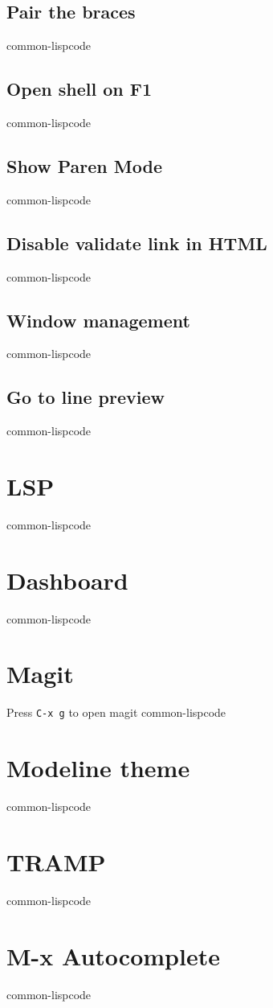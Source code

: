\documentclass[11pt]{article}
\begin{document}
\subsection{Pair the braces}
\label{sec:org5f12339}
common-lispcode
\subsection{Open shell on F1}
\label{sec:org5ad1a31}
common-lispcode
\subsection{Show Paren Mode}
\label{sec:org4413dd3}
common-lispcode
\subsection{Disable validate link in HTML}
\label{sec:orge8611e5}
common-lispcode
\subsection{Window management}
\label{sec:org6d99a04}
common-lispcode
\subsection{Go to line preview}
\label{sec:org6969ddf}
common-lispcode
\section{LSP}
\label{sec:orgeb5079e}
common-lispcode
\section{Dashboard}
\label{sec:org7efc372}
common-lispcode
\section{Magit}
\label{sec:org6244253}

Press \texttt{C-x g} to open magit
common-lispcode
\section{Modeline theme}
\label{sec:orgb4ac815}
common-lispcode
\section{TRAMP}
\label{sec:org92ffcff}
common-lispcode
\section{M-x Autocomplete}
\label{sec:orga4a36f3}
common-lispcode
\end{document}
